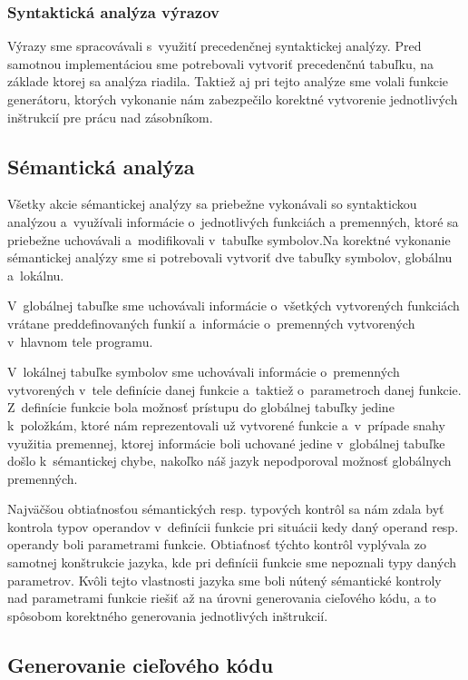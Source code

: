 \documentclass[a4paper, 11pt]{article}
\begin{document}
\subsubsection{Syntaktická analýza výrazov} 
Výrazy sme spracovávali s~využití precedenčnej syntaktickej analýzy. Pred samotnou implementáciou sme potrebovali vytvoriť precedenčnú tabuľku, na základe ktorej sa analýza riadila. Taktiež aj pri tejto analýze sme volali funkcie generátoru, ktorých vykonanie nám zabezpečilo korektné vytvorenie jednotlivých inštrukcií pre prácu nad zásobníkom.

\subsection{Sémantická analýza}
Všetky akcie sémantickej analýzy sa priebežne vykonávali so syntaktickou analýzou a~využívali informácie o~jednotlivých funkciách a premenných, ktoré sa priebežne uchovávali a~modifikovali v~tabuľke symbolov.Na korektné vykonanie sémantickej analýzy sme si potrebovali vytvoriť dve tabuľky symbolov, globálnu a~lokálnu. 

V~globálnej tabuľke sme uchovávali informácie o~všetkých vytvorených funkciách vrátane preddefinovaných funkií a~informácie o~premenných vytvorených v~hlavnom tele programu.

V~lokálnej tabuľke symbolov sme uchovávali informácie o~premenných vytvorených v~tele definície danej funkcie a~taktiež o~parametroch danej funkcie. Z~definície funkcie bola možnosť prístupu do globálnej tabuľky jedine k~položkám, ktoré nám reprezentovali už vytvorené funkcie a~v~prípade snahy využitia premennej, ktorej informácie boli uchované jedine v~globálnej tabuľke došlo k~sémantickej chybe, nakoľko náš jazyk nepodporoval možnosť globálnych premenných.

Najväčšou obtiaťnosťou sémantických resp. typových kontrôl sa nám zdala byť kontrola typov operandov v~definícii funkcie pri situácii kedy daný operand resp. operandy boli parametrami funkcie. Obtiaťnosť týchto kontrôl vyplývala zo samotnej konštrukcie jazyka, kde pri definícii funkcie sme nepoznali typy daných parametrov. Kvôli tejto vlastnosti jazyka sme boli nútený sémantické kontroly nad parametrami funkcie riešiť až na úrovni generovania cieľového kódu, a to spôsobom korektného generovania jednotlivých inštrukcií.


\subsection{Generovanie cieľového kódu}
\end{document}
